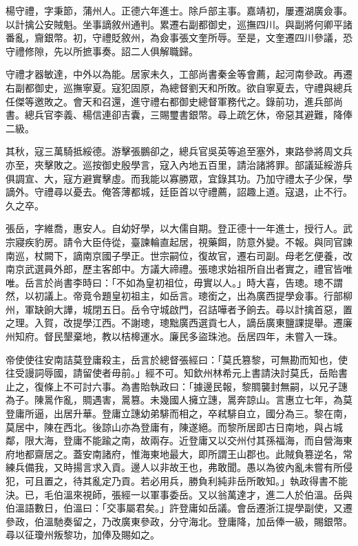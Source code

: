 \begin{pinyinscope}
楊守禮，字秉節，蒲州人。正德六年進士。除戶部主事。嘉靖初，屢遷湖廣僉事。以計擒公安賊魁。坐事謫敘州通判。累遷右副都御史，巡撫四川。與副將何卿平諸番亂，齎銀幣。初，守禮貶敘州，為僉事張文奎所辱。至是，文奎遷四川參議，恐守禮修隙，先以所摭事奏。詔二人俱解職歸。

守禮才器敏達，中外以為能。居家未久，工部尚書秦金等會薦，起河南參政。再遷右副都御史，巡撫寧夏。寇犯固原，為總督劉天和所敗。欲自寧夏去，守禮與總兵任傑等邀敗之。會天和召還，進守禮右都御史總督軍務代之。錄前功，進兵部尚書。總兵官李義、楊信連卻吉囊，三賜璽書銀幣。尋上疏乞休，帝惡其避難，降俸二級。

其秋，寇三萬騎抵綏德。游擊張鵬卻之，總兵官吳英等追至塞外，東路參將周文兵亦至，夾擊敗之。巡按御史殷學言，寇入內地五百里，請治諸將罪。部議延綏游兵俱調宣、大，寇方避實擊虛。而我能以寡勝眾，宜錄其功。乃加守禮太子少保，學謫外。守禮尋以憂去。俺答薄都城，廷臣首以守禮薦，詔趣上道。寇退，止不行。久之卒。

張岳，字維喬，惠安人。自幼好學，以大儒自期。登正德十一年進士，授行人。武宗寢疾豹房。請令大臣侍從，臺諫輪直起居，視藥餌，防意外變。不報。與同官諫南巡，杖闕下，謫南京國子學正。世宗嗣位，復故官，遷右司副。母老乞便養，改南京武選員外郎，歷主客郎中。方議大禘禮。張璁求始祖所自出者實之，禮官皆唯唯。岳言於尚書李時曰：「不如為皇初祖位，毋實以人。」時大喜，告璁。璁不謂然，以初議上。帝竟令題皇初祖主，如岳言。璁銜之，出為廣西提學僉事。行部柳州，軍缺餉大譁，城閉五日。岳令守城啟門，召詰嘩者予餉去。尋以計擒首惡，置之理。入賀，改提學江西。不謝璁，璁黜廣西選貢七人，謫岳廣東鹽課提舉。遷廉州知府。督民墾棄地，教以桔槔運水。廉民多盜珠池。岳居四年，未嘗入一珠。

帝使使往安南詰莫登庸殺主，岳言於總督張經曰：「莫氏篡黎，可無勘而知也，使往受謾詞辱國，請留使者毋前。」經不可。知欽州林希元上書請決討莫氏，岳貽書止之，復條上不可討六事。為書貽執政曰：「據邊民報，黎賙襲封無嗣，以兄子譓為子。陳暠作亂，賙遇害，暠篡。未幾國人擁立譓，暠奔諒山。言惠立七年，為莫登庸所逼，出居升華。登庸立譓幼弟騑而相之，卒弒騑自立，國分為三。黎在南，莫居中，陳在西北。後諒山亦為登庸有，陳遂絕。而黎所居即古日南地，與占城鄰，限大海，登庸不能踰之南，故兩存。近登庸又以交州付其孫福海，而自營海東府地都齋居之。蓋安南諸府，惟海東地最大，即所謂王山郡也。此賊負篡逆名，常練兵備我，又時揚言求入貢。邊人以非故王也，弗敢聞。愚以為彼內亂未嘗有所侵犯，可且置之，待其亂定乃貢。若必用兵，勝負利純非岳所敢知。」執政得書不能決。已，毛伯溫來視師，張經一以軍事委岳。又以翁萬達才，進二人於伯溫。岳與伯溫語數日，伯溫曰：「交事屬君矣。」許登庸如岳議。會岳遷浙江提學副使，又遷參政，伯溫馳奏留之，乃改廣東參政，分守海北。登庸降，加岳俸一級，賜銀幣。尋以征瓊州叛黎功，加俸及賜如之。


\end{pinyinscope}
